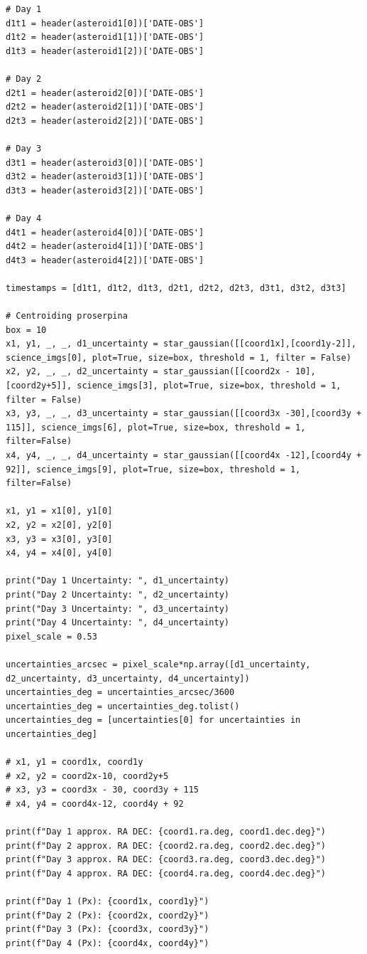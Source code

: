 \documentclass{article}
\begin{document}
\begin{appendices}
\begin{small}
\begin{verbatim}
# Day 1
d1t1 = header(asteroid1[0])['DATE-OBS']
d1t2 = header(asteroid1[1])['DATE-OBS']
d1t3 = header(asteroid1[2])['DATE-OBS']

# Day 2
d2t1 = header(asteroid2[0])['DATE-OBS']
d2t2 = header(asteroid2[1])['DATE-OBS']
d2t3 = header(asteroid2[2])['DATE-OBS']

# Day 3
d3t1 = header(asteroid3[0])['DATE-OBS']
d3t2 = header(asteroid3[1])['DATE-OBS']
d3t3 = header(asteroid3[2])['DATE-OBS']

# Day 4 
d4t1 = header(asteroid4[0])['DATE-OBS']
d4t2 = header(asteroid4[1])['DATE-OBS']
d4t3 = header(asteroid4[2])['DATE-OBS']

timestamps = [d1t1, d1t2, d1t3, d2t1, d2t2, d2t3, d3t1, d3t2, d3t3]

# Centroiding proserpina
box = 10
x1, y1, _, _, d1_uncertainty = star_gaussian([[coord1x],[coord1y-2]], science_imgs[0], plot=True, size=box, threshold = 1, filter = False)
x2, y2, _, _, d2_uncertainty = star_gaussian([[coord2x - 10],[coord2y+5]], science_imgs[3], plot=True, size=box, threshold = 1, filter = False)
x3, y3, _, _, d3_uncertainty = star_gaussian([[coord3x -30],[coord3y + 115]], science_imgs[6], plot=True, size=box, threshold = 1, filter=False)
x4, y4, _, _, d4_uncertainty = star_gaussian([[coord4x -12],[coord4y + 92]], science_imgs[9], plot=True, size=box, threshold = 1, filter=False)

x1, y1 = x1[0], y1[0]
x2, y2 = x2[0], y2[0]
x3, y3 = x3[0], y3[0]
x4, y4 = x4[0], y4[0]

print("Day 1 Uncertainty: ", d1_uncertainty)
print("Day 2 Uncertainty: ", d2_uncertainty)
print("Day 3 Uncertainty: ", d3_uncertainty)
print("Day 4 Uncertainty: ", d4_uncertainty)
pixel_scale = 0.53

uncertainties_arcsec = pixel_scale*np.array([d1_uncertainty, d2_uncertainty, d3_uncertainty, d4_uncertainty])
uncertainties_deg = uncertainties_arcsec/3600
uncertainties_deg = uncertainties_deg.tolist()
uncertainties_deg = [uncertainties[0] for uncertainties in uncertainties_deg]

# x1, y1 = coord1x, coord1y
# x2, y2 = coord2x-10, coord2y+5
# x3, y3 = coord3x - 30, coord3y + 115
# x4, y4 = coord4x-12, coord4y + 92

print(f"Day 1 approx. RA DEC: {coord1.ra.deg, coord1.dec.deg}")
print(f"Day 2 approx. RA DEC: {coord2.ra.deg, coord2.dec.deg}")
print(f"Day 3 approx. RA DEC: {coord3.ra.deg, coord3.dec.deg}")
print(f"Day 4 approx. RA DEC: {coord4.ra.deg, coord4.dec.deg}")

print(f"Day 1 (Px): {coord1x, coord1y}")
print(f"Day 2 (Px): {coord2x, coord2y}")
print(f"Day 3 (Px): {coord3x, coord3y}")
print(f"Day 4 (Px): {coord4x, coord4y}")


\end{verbatim}
\end{small}
\end{appendices}
\end{document}
